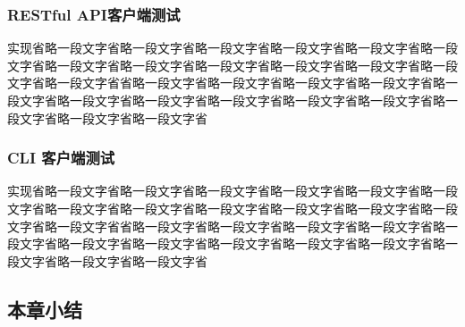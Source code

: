  	\subsubsection{RESTful API客户端测试}
 	
 	实现省略一段文字省略一段文字省略一段文字省略一段文字省略一段文字省略一段文字省略一段文字省略一段文字省略一段文字省略一段文字省略一段文字省略一段文字省略一段文字省省略一段文字省略一段文字省略一段文字省略一段文字省略一段文字省略一段文字省略一段文字省略一段文字省略一段文字省略一段文字省略一段文字省略一段文字省略一段文字省 	
 	
 	\subsubsection{CLI 客户端测试}
	
	实现省略一段文字省略一段文字省略一段文字省略一段文字省略一段文字省略一段文字省略一段文字省略一段文字省略一段文字省略一段文字省略一段文字省略一段文字省略一段文字省省略一段文字省略一段文字省略一段文字省略一段文字省略一段文字省略一段文字省略一段文字省略一段文字省略一段文字省略一段文字省略一段文字省略一段文字省略一段文字省

	\subsection{本章小结}
	
\clearpage